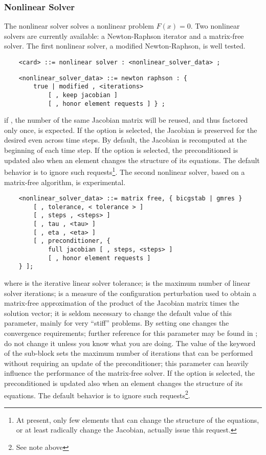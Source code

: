 \subsubsection{Nonlinear Solver}
The nonlinear solver solves a nonlinear problem $F(x)=0$.
Two nonlinear solvers are currently available:
a Newton-Raphson iterator and a matrix-free solver.
The first nonlinear solver, a modified Newton-Raphson, 
is well tested.
\begin{verbatim}
    <card> ::= nonlinear solver : <nonlinear_solver_data> ;
\end{verbatim}
\begin{verbatim}
    <nonlinear_solver_data> ::= newton raphson : { 
        true | modified , <iterations>
            [ , keep jacobian ]
            [ , honor element requests ] } ;
\end{verbatim}
if , the number of  the same Jacobian matrix 
will be reused, and thus factored only once, is expected.
If the option  is selected, the Jacobian is preserved
for the desired  even across time steps.
By default, the Jacobian is recomputed at the beginning of each time step.
If the option  is selected, the preconditioned
is updated also when an element changes the structure of its equations.
The default behavior is to ignore such requests\footnote{
	At present, only few elements that can change the structure
	of the equations, or at least radically change the Jacobian,
	actually issue this request.
}.
The second nonlinear solver, based on a
matrix-free algorithm, is experimental.
\begin{verbatim}
    <nonlinear_solver_data> ::= matrix free, { bicgstab | gmres }
        [ , tolerance, < tolerance > ]
        [ , steps , <steps> ]
        [ , tau , <tau> ]
        [ , eta , <eta> ]
        [ , preconditioner, {
            full jacobian [ , steps, <steps> ] 
	        [ , honor element requests ]
    } ];
\end{verbatim}
where  is the iterative linear solver tolerance;
 is the maximum number of linear solver iterations;
 is a measure of the configuration perturbation used
to obtain a matrix-free approximation of the product
of the Jacobian matrix times the solution vector;
it is seldom necessary to change the default value of this parameter,
mainly for very ``stiff'' problems.
By setting  one changes the convergence requirements; 
further reference for this parameter may be found in \cite{KELLEY-1995}; 
do not change it unless you know what you are doing.
The value  of the  keyword 
of the  sub-block 
sets the maximum number of iterations that can be performed 
without requiring an update of the preconditioner; 
this parameter can heavily influence
the performance of the matrix-free solver.
If the option  is selected, the preconditioned
is updated also when an element changes the structure of its equations.
The default behavior is to ignore such requests\footnote{See note above}.


